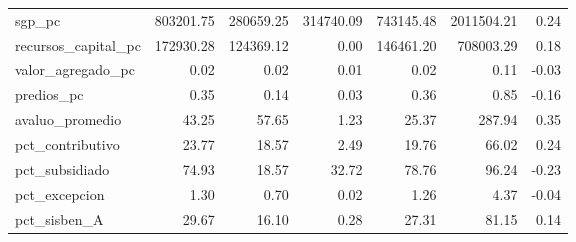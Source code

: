\begin{longtable}[t]{lrrrrrr}
sgp\_pc & 803201.75 & 280659.25 & 314740.09 & 743145.48 & 2011504.21 & 0.24\\
recursos\_capital\_pc & 172930.28 & 124369.12 & 0.00 & 146461.20 & 708003.29 & 0.18\\
valor\_agregado\_pc & 0.02 & 0.02 & 0.01 & 0.02 & 0.11 & -0.03\\
\addlinespace
predios\_pc & 0.35 & 0.14 & 0.03 & 0.36 & 0.85 & -0.16\\
avaluo\_promedio & 43.25 & 57.65 & 1.23 & 25.37 & 287.94 & 0.35\\
pct\_contributivo & 23.77 & 18.57 & 2.49 & 19.76 & 66.02 & 0.24\\
pct\_subsidiado & 74.93 & 18.57 & 32.72 & 78.76 & 96.24 & -0.23\\
pct\_excepcion & 1.30 & 0.70 & 0.02 & 1.26 & 4.37 & -0.04\\
\addlinespace
pct\_sisben\_A & 29.67 & 16.10 & 0.28 & 27.31 & 81.15 & 0.14\\
\bottomrule
\end{longtable}
